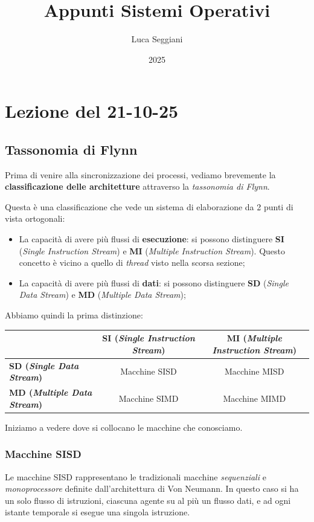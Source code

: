 \documentclass[a4paper,11pt]{article}
\title{Appunti Sistemi Operativi}
\author{Luca Seggiani}
\date{2025}
\begin{document}
\section{Lezione del 21-10-25}

\thispagestyle{empty}
\pagestyle{fancy}

\subsection{Tassonomia di Flynn}
Prima di venire alla sincronizzazione dei processi, vediamo brevemente la \textbf{classificazione delle architetture} attraverso la \textit{tassonomia di Flynn}.

Questa è una classificazione che vede un sistema di elaborazione da 2 punti di vista ortogonali:
\begin{itemize}
	\item La capacità di avere più flussi di \textbf{esecuzione}: si possono distinguere \textbf{SI} (\textit{Single Instruction Stream}) e \textbf{MI} (\textit{Multiple Instruction Stream}). Questo concetto è vicino a quello di \textit{thread} visto nella scorsa sezione;
	\item La capacità di avere più flussi di \textbf{dati}: si possono distinguere \textbf{SD} (\textit{Single Data Stream}) e \textbf{MD} (\textit{Multiple Data Stream});
\end{itemize}

Abbiamo quindi la prima distinzione:
\begin{table}[H]
	\center {}
	\begin{tabular} { p{3.5cm} || c | c  }
		& \bfseries SI (\textit{Single Instruction Stream}) & \bfseries MI (\textit{Multiple Instruction Stream}) \\
		\hline\hline
		\bfseries SD (\textit{Single Data Stream}) & Macchine SISD & Macchine MISD \\
		\bfseries MD (\textit{Multiple Data Stream}) & Macchine SIMD & Macchine MIMD \\
	\end{tabular}
\end{table}

Iniziamo a vedere dove si collocano le macchine che conosciamo.

\subsubsection{Macchine SISD}
Le macchine SISD rappresentano le tradizionali macchine \textit{sequenziali} e \textit{monoprocessore} definite dall'architettura di Von Neumann.
In questo caso si ha un solo flusso di istruzioni, ciascuna agente su al più un flusso dati, e ad ogni istante temporale si esegue una singola istruzione.
\end{document}
